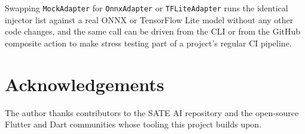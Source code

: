 \documentclass[
  11pt,
]{article}
\newenvironment{Shaded}{}{}
\newcommand{\AttributeTok}[1]{\textcolor[rgb]{0.49,0.56,0.16}{#1}}
\newcommand{\ControlFlowTok}[1]{\textcolor[rgb]{0.00,0.44,0.13}{\textbf{#1}}}
\newcommand{\DataTypeTok}[1]{\textcolor[rgb]{0.56,0.13,0.00}{#1}}
\newcommand{\DecValTok}[1]{\textcolor[rgb]{0.25,0.63,0.44}{#1}}
\newcommand{\KeywordTok}[1]{\textcolor[rgb]{0.00,0.44,0.13}{\textbf{#1}}}
\newcommand{\NormalTok}[1]{#1}
\newcommand{\OperatorTok}[1]{\textcolor[rgb]{0.40,0.40,0.40}{#1}}
\newcommand{\StringTok}[1]{\textcolor[rgb]{0.25,0.44,0.63}{#1}}
\begin{document}
\begin{Shaded}
\end{Shaded}

Swapping \texttt{MockAdapter} for \texttt{OnnxAdapter} or
\texttt{TFLiteAdapter} runs the identical injector list against a real
ONNX or TensorFlow Lite model without any other code changes, and the
same call can be driven from the CLI or from the GitHub composite action
to make stress testing part of a project's regular CI pipeline.

\hypertarget{acknowledgements}{%
\section{Acknowledgements}\label{acknowledgements}}

The author thanks contributors to the SATE AI repository and the
open-source Flutter and Dart communities whose tooling this project
builds upon.
\end{document}
